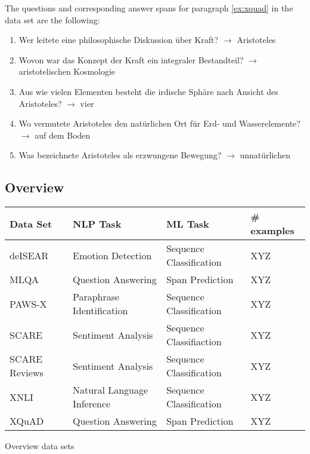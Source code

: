 The questions and corresponding answer spans for paragraph \ref{ex:xquad} in the data set are the following:

\begin{enumerate}
	\item Wer leitete eine philosophische Diskussion über Kraft? $\rightarrow$ Aristoteles
	\item Wovon war das Konzept der Kraft ein integraler Bestandteil? $\rightarrow$ aristotelischen Kosmologie
	\item Aus wie vielen Elementen besteht die irdische Sphäre nach Ansicht des Aristoteles? $\rightarrow$ vier
	\item Wo vermutete Aristoteles den natürlichen Ort für Erd- und Wasserelemente? $\rightarrow$ auf dem Boden
	\item Was bezeichnete Aristoteles als erzwungene Bewegung? $\rightarrow$ unnatürlichen
\end{enumerate}

\cite{artetxe2019cross}

\subsection{Overview}

{\begin{tabular}{l|lll}
	Data Set & NLP Task  & ML Task  & \# examples \\
	\hline
	deISEAR &  Emotion Detection & Sequence Classification  & XYZ \\
	MLQA & Question Answering & Span Prediction & XYZ \\
	PAWS-X & Paraphrase Identification & Sequence Classification & XYZ \\
	SCARE & Sentiment Analysis & Sequence Classifiaction & XYZ \\
	SCARE Reviews &  Sentiment Analysis & Sequence Classification & XYZ \\
	XNLI & Natural Language Inference & Sequence Classification &  XYZ \\
	XQuAD & Question Answering & Span Prediction & XYZ \\
\end{tabular}
}{Overview data sets}

